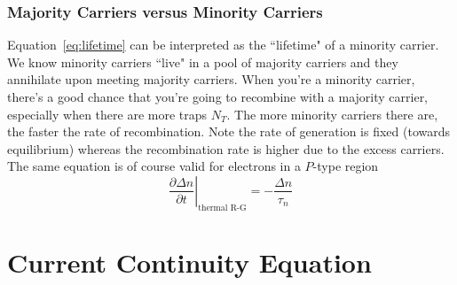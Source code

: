 \subsubsection*{Majority Carriers versus Minority Carriers}
Equation~\ref{eq:lifetime} can be interpreted as the ``lifetime" of a minority carrier.  We know minority carriers ``live" in a pool of majority carriers and they annihilate upon meeting majority carriers.  When you're a minority carrier, there's a good chance that you're going to recombine with a majority carrier, especially when there are more traps $N_T$.  The more minority carriers there are, the faster the rate of recombination.  Note the rate of generation is fixed (towards equilibrium) whereas the recombination rate is higher due to the excess carriers.  The same equation is of course valid for electrons in a $P$-type region
    \begin{equation}
        \left. \frac{\partial \Delta n}{\partial t} \right|_{\text{thermal R-G}} = - \frac{\Delta n}{\tau_n}
    \end{equation}
\section{Current Continuity Equation}
